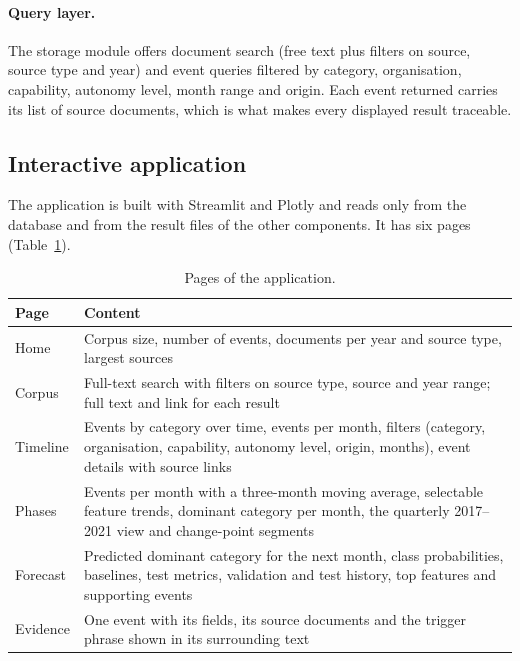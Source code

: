 \documentclass[11pt,a4paper]{article}
\begin{document}
\paragraph{Query layer.} The storage module offers document search (free text plus filters on source, source
type and year) and event queries filtered by category, organisation, capability, autonomy level, month range and
origin. Each event returned carries its list of source documents, which is what makes every displayed result
traceable.

\subsection{Interactive application}
\label{sec:app}
The application is built with Streamlit and Plotly and reads only from the database and from the result files
of the other components. It has six pages (Table~\ref{tab:pages}).

\begin{table}[ht]
\centering
\small
\begin{tabular}{@{}lp{12cm}@{}}
\toprule
Page & Content \\
\midrule
Home & Corpus size, number of events, documents per year and source type, largest sources \\
Corpus & Full-text search with filters on source type, source and year range; full text and link for each result \\
Timeline & Events by category over time, events per month, filters (category, organisation, capability, autonomy
level, origin, months), event details with source links \\
Phases & Events per month with a three-month moving average, selectable feature trends, dominant category per
month, the quarterly 2017--2021 view and change-point segments \\
Forecast & Predicted dominant category for the next month, class probabilities, baselines, test metrics,
validation and test history, top features and supporting events \\
Evidence & One event with its fields, its source documents and the trigger phrase shown in its surrounding text \\
\bottomrule
\end{tabular}
\caption{Pages of the application.}
\label{tab:pages}
\end{table}
\end{document}
